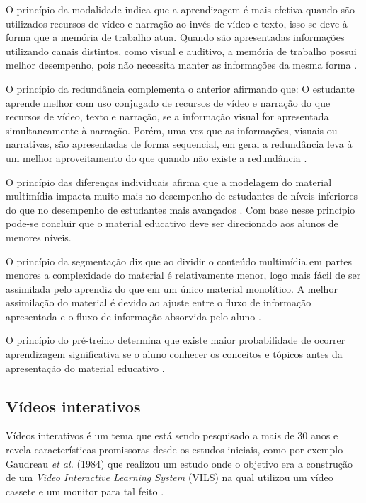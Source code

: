 O princípio da modalidade indica que a aprendizagem é mais efetiva quando são utilizados recursos de vídeo e narração ao invés de vídeo e texto, isso se deve à forma que a memória de trabalho atua. Quando são apresentadas informações utilizando canais distintos, como visual e auditivo, a memória de trabalho possui melhor desempenho, pois não necessita manter as informações da mesma forma \cite{mayer2001}. 

O princípio da redundância complementa o anterior afirmando que: O estudante aprende melhor com uso conjugado de recursos de vídeo e narração do que recursos de vídeo, texto e narração, se a informação visual for apresentada simultaneamente à narração. Porém, uma vez que as informações, visuais ou narrativas, são apresentadas de forma sequencial, em geral a redundância leva à um melhor aproveitamento do que quando não existe a redundância \cite{moreno2000}.

O  princípio  das  diferenças  individuais  afirma  que  a  modelagem  do  material multimídia impacta muito mais no desempenho de estudantes de níveis inferiores do que no desempenho de estudantes mais avançados \cite{mayer2001}. Com base nesse princípio pode-se concluir que o material educativo deve ser direcionado aos alunos de menores níveis.

O princípio da segmentação diz que ao dividir o conteúdo multimídia em partes menores a complexidade do material é relativamente menor, logo mais fácil de ser assimilada pelo aprendiz do que em um único material monolítico. A melhor assimilação do material é devido ao ajuste entre o fluxo de informação apresentada e o fluxo de informação absorvida pelo aluno \cite{mayer2001, moreno2000}.

O princípio do pré-treino determina que existe maior probabilidade de ocorrer aprendizagem significativa se o aluno conhecer os conceitos e tópicos antes da apresentação do material educativo \cite{mayer2001, moreno2000}.

\subsection{Vídeos interativos}

Vídeos interativos é um tema que está sendo pesquisado a mais de 30 anos e revela características promissoras desde os estudos iniciais, como por exemplo Gaudreau \textit{et al.} (1984) que realizou um estudo onde o objetivo era a construção de um \textit{Video Interactive Learning System} (VILS) na qual utilizou um vídeo cassete e um monitor para tal feito \cite{gaudreau1984}.

